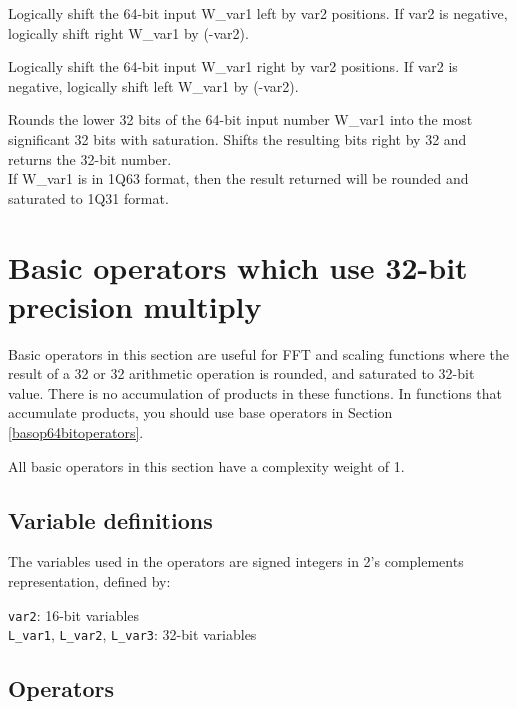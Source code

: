 Logically shift the 64-bit input W\_var1 left by var2 positions.
If var2 is negative, logically shift right W\_var1 by (-var2).


Logically shift the 64-bit input W\_var1 right by var2 positions.
If var2 is negative, logically shift left W\_var1 by (-var2).


Rounds the lower 32 bits of the 64-bit input number W\_var1 into the most significant 32 bits with saturation.
Shifts the resulting bits right by 32 and returns the 32-bit number.\\
If W\_var1 is in 1Q63 format, then the result returned will be rounded and saturated to 1Q31 format.



\section{Basic operators which use 32-bit precision multiply}

Basic operators in this section are useful for FFT and scaling functions where the result of a 32 or 32 arithmetic operation is rounded, and saturated to 32-bit value.
There is no accumulation of products in these functions.
In functions that accumulate products, you should use base operators in Section \ref{basop64bitoperators}.

All basic operators in this section have a complexity weight of 1.

\subsection{Variable definitions}

The variables used in the operators are signed integers in 2's complements representation, defined by:

{\tt var2}: 16-bit variables\\
{\tt L\_var1}, {\tt L\_var2}, {\tt L\_var3}: 32-bit variables


\subsection{Operators}

